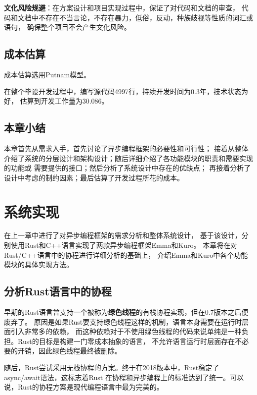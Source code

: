 \documentclass[supercite]{HustGraduPaper}
\theoremstyle{definition}
\begin{document}
\textbf{文化风险规避}：在方案设计和项目实现过程中，保证了对代码和文档的审查，
代码和文档中不存在不当言论，不存在暴力，低俗，反动，种族歧视等性质的词汇或语句，
确保整个项目不会产生文化风险。\par

\subsection{成本估算}

成本估算选用Putnam模型。\par

在整个毕设开发过程中，编写源代码4997行，持续开发时间为0.3年，技术状态为好，
估算到开发工作量为30.086。\par

\subsection{本章小结}

本章首先从需求入手，首先讨论了异步编程框架的必要性和可行性；
接着从整体介绍了系统的分层设计和架构设计；随后详细介绍了各功能模块的职责和需要实现的功能或
需要提供的接口；然后分析了系统设计中存在的优缺点；
再接着分析了设计中考虑的制约因素；最后估算了开发过程所花的成本。\par

\section{系统实现}

在上一章中进行了对异步编程框架的需求分析和整体系统设计，
基于该设计，分别使用Rust和C++语言实现了两款异步编程框架Emma和Kuro。
本章将在对Rust/C++语言中的协程进行详细分析的基础上，
介绍Emma和Kuro中各个功能模块的具体实现方法。\par

\subsection{分析Rust语言中的协程}
早期的Rust语言曾支持一个被称为\textbf{绿色线程}的有栈协程实现，但在0.7版本之后便废弃了。
原因是如果Rust要支持绿色线程这样的机制，语言本身需要在运行时层面引入非常多的依赖，
而这种依赖对于不使用绿色线程的代码来说单纯是一种负担。Rust的目标是构建一门零成本抽象的语言，
不允许语言运行时层面存在不必要的开销，因此绿色线程最终被删除。\par

随后，Rust尝试采用无栈协程的方案。终于在2018版本中，Rust稳定了async/await语法，这标志着Rust
在协程和异步编程上的标准达到了统一。可以说，Rust的协程方案是现代编程语言中最为完美的。\par
\end{document}

